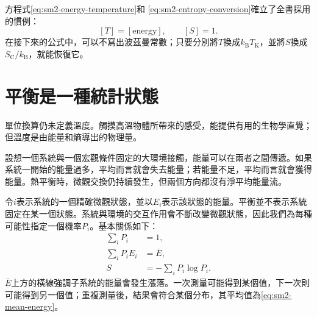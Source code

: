 方程式\eqref{eq:sm2-energy-temperature}和
\eqref{eq:sm2-entropy-conversion}確立了全書採用的慣例：
\[
 [T]=[\text{energy}],
 \qquad
 [S]=1.
\]
在接下來的公式中，可以不寫出波茲曼常數；只要分別將\(T\)換成\(k_{\mathrm B}T_{\mathrm K}\)，並將\(S\)換成\(S_{\mathrm C}/k_{\mathrm B}\)，就能恢復它。

\begin{classroomqa}
\end{classroomqa}

\begin{classroomqa}
\end{classroomqa}

\begin{classroomqa}
\end{classroomqa}

\section{平衡是一種統計狀態}

單位換算仍未定義溫度。觸摸高溫物體所帶來的感受，能提供有用的生物學直覺；但溫度是由能量和熵導出的物理量。

設想一個系統與一個宏觀條件固定的大環境接觸，能量可以在兩者之間傳遞。如果系統一開始的能量過多，平均而言就會失去能量；若能量不足，平均而言就會獲得能量。熱平衡時，微觀交換仍持續發生，但兩個方向都沒有淨平均能量流。

令\(i\)表示系統的一個精確微觀狀態，並以\(E_i\)表示該狀態的能量。平衡並不表示系統固定在某一個狀態。系統與環境的交互作用會不斷改變微觀狀態，因此我們為每種可能性指定一個機率\(P_i\)。基本關係如下：
\begin{align}
 \sum_i P_i &=1,
 \label{eq:sm2-normalization}\\
 \sum_i P_iE_i &=\overline E,
 \label{eq:sm2-mean-energy}\\
 S&=-\sum_iP_i\log P_i.
 \label{eq:sm2-equilibrium-entropy}
\end{align}
\(\overline E\)上方的橫線強調子系統的能量會發生漲落。一次測量可能得到某個值，下一次則可能得到另一個值；重複測量後，結果會符合某個分布，其平均值為\eqref{eq:sm2-mean-energy}。

